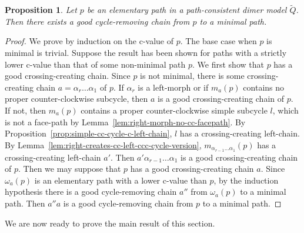 \documentclass{article}
\newtheorem{prop}[thm]{Proposition}
\theoremstyle{definition}
\begin{document}
\begin{prop}\label{lem:cycle-removing-no-right-cc-cycle}
	Let $p$ be an elementary path in a path-consistent dimer model $\widetilde Q$. Then there exists a good cycle-removing chain from $p$ to a minimal path.
\end{prop}
\begin{proof}
	We prove by induction on the c-value of $p$. The base case when $p$ is minimal is trivial. 
	Suppose the result has been shown for paths with a strictly lower c-value than that of some non-minimal path $p$. We first show that $p$ has a good crossing-creating chain.
	Since $p$ is not minimal, there is some crossing-creating chain $a=\alpha_r\dots\alpha_1$ of $p$. If $\alpha_r$ is a left-morph or if $m_a(p)$ contains no proper counter-clockwise subcycle, then $a$ is a good crossing-creating chain of $p$. If not, then $m_a(p)$ contains a proper counter-clockwise simple subcycle $l$, which is not a face-path by Lemma~\ref{lem:right-morph-no-cc-facepath}. By Proposition~\ref{prop:simple-cc-cycle-c-left-chain}, $l$ has a crossing-creating left-chain. By Lemma~\ref{lem:right-creates-cc-left-ccc-cycle-version}, $m_{\alpha_{r-1}\dots\alpha_{1}}(p)$ has a crossing-creating left-chain $a'$. Then $a'\alpha_{r-1}\dots\alpha_1$ is a good crossing-creating chain of $p$. Then we may suppose that $p$ has a good crossing-creating chain $a$. Since $\omega_a(p)$ is an elementary path with a lower c-value than $p$, by the induction hypothesis there is a good cycle-removing chain $a''$ from $\omega_a(p)$ to a minimal path. Then $a''a$ is a good cycle-removing chain from $p$ to a minimal path.





\end{proof}

We are now ready to prove the main result of this section.
\end{document}
